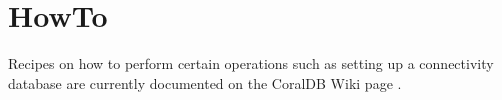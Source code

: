 
\section{HowTo}
\label{HOWTO}


Recipes on how to perform certain operations such as setting up a connectivity database
are currently documented on the CoralDB Wiki page \cite{WIKI}.
